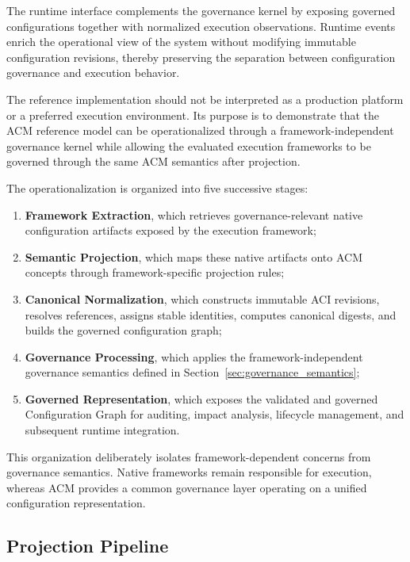 \documentclass[10pt]{article}
\begin{document}
The runtime interface complements the governance kernel by exposing governed configurations together with normalized execution observations. Runtime events enrich the operational view of the system without modifying immutable configuration revisions, thereby preserving the separation between configuration governance and execution behavior.

The reference implementation should not be interpreted as a production platform or a preferred execution environment. Its purpose is to demonstrate that the ACM reference model can be operationalized through a framework-independent governance kernel while allowing the evaluated execution frameworks to be governed through the same ACM semantics after projection.

The operationalization is organized into five successive stages:

\begin{enumerate}
	\item \textbf{Framework Extraction}, which retrieves governance-relevant native configuration artifacts exposed by the execution framework;
	
	\item \textbf{Semantic Projection}, which maps these native artifacts onto ACM concepts through framework-specific projection rules;
	
	\item \textbf{Canonical Normalization}, which constructs immutable ACI revisions, resolves references, assigns stable identities, computes canonical digests, and builds the governed configuration graph;
	
	\item \textbf{Governance Processing}, which applies the framework-independent governance semantics defined in Section~\ref{sec:governance_semantics};
	
	\item \textbf{Governed Representation}, which exposes the validated and governed
	Configuration Graph for auditing, impact analysis, lifecycle management, and
	subsequent runtime integration.
\end{enumerate}

This organization deliberately isolates framework-dependent concerns from governance semantics. Native frameworks remain responsible for execution, whereas ACM provides a common governance layer operating on a unified configuration representation.


\subsection{Projection Pipeline}
\label{subsec:semantic_projection_pipeline}
\end{document}
